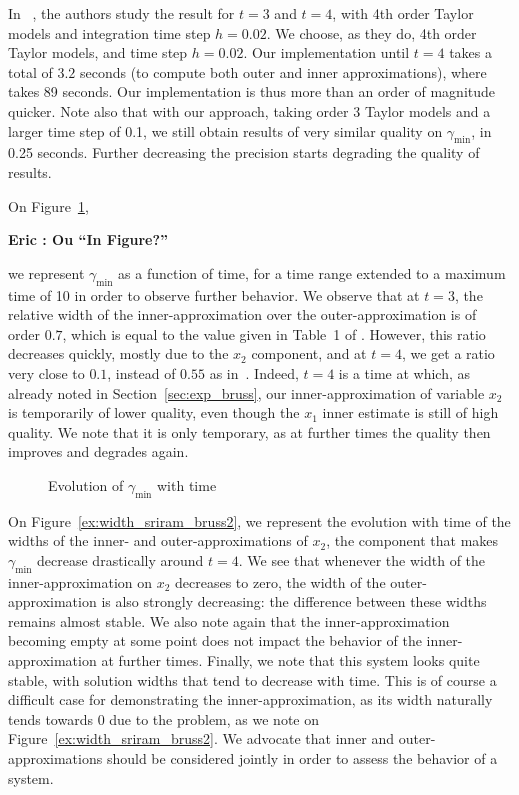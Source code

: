 \documentclass{sig-alternate-05-2015}
\newcommand{\addTODO}[1]{\addcontentsline{tdo}{toc}{#1}}
\newcommand{\TODO}[1]{{\bf{\scriptsize #1}\addTODO{#1}}}
\newcommand{\EG}[1]{\TODO{Eric : #1}}
\begin{document}
In ~\cite{Underapproxflowpipes}, the authors study the result for $t=3$ and $t=4$, with 4th order Taylor models and integration time step $h=0.02$. 
We choose, as they do, 4th order Taylor models,  and time step $h=0.02$. Our implementation until $t=4$
takes a total of $3.2$ seconds (to compute both outer and inner approximations), where \cite{Underapproxflowpipes} takes 89 seconds.
Our implementation is thus more than an order of magnitude quicker.
Note also that with our approach, taking order 3 Taylor models and a larger time step of 0.1, we still obtain results of very similar quality on $\gamma_{\min}$, in 0.25 seconds. 
Further decreasing the precision starts degrading the quality of results. 



On Figure~\ref{ex:width_sriram_bruss1}, \EG{Ou ``In Figure?''} we represent $\gamma_{\min}$ as a function of time, for a  time range 
extended to a maximum time of 10 in order to observe further behavior. 
We observe that at $t=3$, the relative width of the inner-approximation over the
outer-approximation is of order $0.7$, which is equal to the value given in Table~1 of \cite{Underapproxflowpipes}. 
However, this ratio decreases quickly, mostly due to the $x_2$ component, and at $t=4$, we get a ratio very close to $0.1$,
instead of $0.55$ as in~\cite{Underapproxflowpipes}. Indeed, $t=4$ is a time at which, as already noted in Section~\ref{sec:exp_bruss}, our 
inner-approximation of variable $x_2$ is temporarily of lower quality, even though the $x_1$ inner estimate
is still of high quality. We note that it is only temporary, as at further times the quality then improves and degrades again. 
\begin{figure}[htbp]
\begin{center}
\end{center}
\caption{Evolution of $\gamma_{\min}$ with time \label{ex:width_sriram_bruss1} }
\end{figure}
On Figure~\ref{ex:width_sriram_bruss2}, we represent the evolution with time of the widths of the inner- and outer-approximations of $x_2$, 
the component that makes $\gamma_{\min}$ decrease drastically around $t=4$. We see that whenever the width of the inner-approximation on $x_2$ decreases 
to zero, the width of the outer-approximation is also strongly decreasing: the difference between these widths remains 
almost stable. We also note again that the inner-approximation becoming empty at some point does not impact the behavior of the inner-approximation 
at further times. Finally, we note that this system looks quite stable, with solution widths that tend to decrease with time. This is of course a
difficult case for demonstrating  the inner-approximation, as its width naturally tends towards 0 due to the problem, as we note on 
Figure~\ref{ex:width_sriram_bruss2}. We advocate that inner and outer-approximations should be considered jointly in order to assess 
the behavior of a system. 
\end{document}
